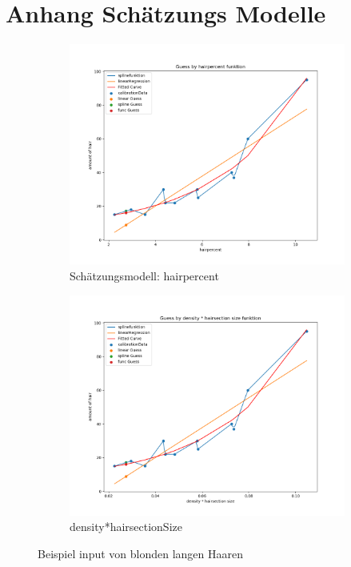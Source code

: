 \documentclass[german,a4paper, 12pt]{scrartcl}
\begin{document}
\section{Anhang Schätzungs Modelle}
\begin{figure}
	\centering
	\begin{subfigure}[b]{0.475\textwidth}
		\centering
		\includegraphics[width=1.2\textwidth]{fig64/g01_hairpercent.png}
		\caption[]{Schätzungsmodell: hairpercent}
		\label{img:cover}

	\end{subfigure}
	\hfill
	\begin{subfigure}[b]{0.475\textwidth} 
		\centering
		\includegraphics[width=1.2\textwidth]{fig64/g02_densitynorm.png}
		\caption[]{density*hairsectionSize}
		\label{img:cover}
	\end{subfigure}
	\caption[  ]
	{\small Beispiel input von blonden langen Haaren} 
	\label{img:tstM}
\end{figure}
\end{document}
